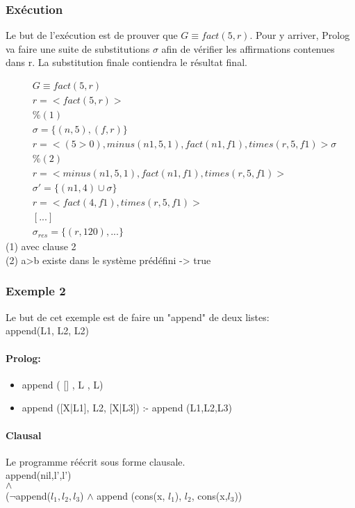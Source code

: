 \subsubsection{Exécution} 
Le but de l'exécution est de prouver que $G \equiv fact(5, r)$. Pour y arriver, Prolog va faire une suite de substitutions $\sigma$ afin de vérifier les affirmations contenues dans r. La substitution finale contiendra le résultat final.

\begin{align*}
& G \equiv fact(5,r) \\
& r= < fact(5, r) > \\
& \% (1) \\
& \sigma = \{ (n, 5), (f, r) \} \\
& r= < ( 5>0 ), minus(n1, 5, 1), fact(n1, f1), times(r, 5, f1) > \sigma \\
& \% (2) \\
& r= < minus(n1, 5, 1), fact(n1, f1), times(r, 5, f1) > \\
& \sigma'= \{ (n1, 4) \cup \sigma\} \\
& r= < fact (4, f1), times(r, 5, f1) > \\
& [...]\\
& \sigma_{res} = \{(r,120),...\} 
\end{align*}
(1) avec clause 2\\
(2) a>b existe dans le système prédéfini -> true\\

\subsubsection{Exemple 2}
Le but de cet exemple est de faire un "append" de deux listes:\\
append(L1, L2, L2)
\paragraph{Prolog:}
\begin{itemize}
\item append ( [] , L , L)
\item append ([X|L1], L2, [X|L3]) :- append (L1,L2,L3)
\end{itemize}
\paragraph{Clausal}
Le programme réécrit sous forme clausale.\\
append(nil,l',l')\\
$\land$\\
($\neg$append($l_1,l_2,l_3$) $\land$ append (cons(x, $l_1$), $l_2$, cons(x,$l_3$))
